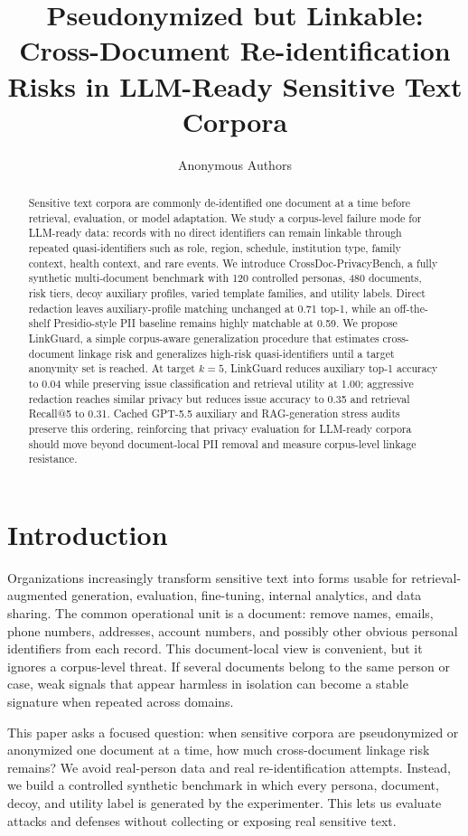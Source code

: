 \documentclass[10pt,twocolumn]{article}
\title{Pseudonymized but Linkable:\\
Cross-Document Re-identification Risks in LLM-Ready Sensitive Text Corpora}
\author{Anonymous Authors}
\date{}
\newcommand{\method}{LinkGuard}
\newcommand{\bench}{CrossDoc-PrivacyBench}
\begin{document}
\maketitle

\begin{abstract}
Sensitive text corpora are commonly de-identified one document at a time before retrieval, evaluation, or model adaptation.
We study a corpus-level failure mode for LLM-ready data: records with no direct identifiers can remain linkable through repeated quasi-identifiers such as role, region, schedule, institution type, family context, health context, and rare events.
We introduce \bench, a fully synthetic multi-document benchmark with 120 controlled personas, 480 documents, risk tiers, decoy auxiliary profiles, varied template families, and utility labels.
Direct redaction leaves auxiliary-profile matching unchanged at 0.71 top-1, while an off-the-shelf Presidio-style PII baseline remains highly matchable at 0.59.
We propose \method, a simple corpus-aware generalization procedure that estimates cross-document linkage risk and generalizes high-risk quasi-identifiers until a target anonymity set is reached.
At target $k=5$, \method{} reduces auxiliary top-1 accuracy to 0.04 while preserving issue classification and retrieval utility at 1.00; aggressive redaction reaches similar privacy but reduces issue accuracy to 0.35 and retrieval Recall@5 to 0.31.
Cached GPT-5.5 auxiliary and RAG-generation stress audits preserve this ordering, reinforcing that privacy evaluation for LLM-ready corpora should move beyond document-local PII removal and measure corpus-level linkage resistance.
\end{abstract}

\section{Introduction}
Organizations increasingly transform sensitive text into forms usable for retrieval-augmented generation, evaluation, fine-tuning, internal analytics, and data sharing.
The common operational unit is a document: remove names, emails, phone numbers, addresses, account numbers, and possibly other obvious personal identifiers from each record.
This document-local view is convenient, but it ignores a corpus-level threat.
If several documents belong to the same person or case, weak signals that appear harmless in isolation can become a stable signature when repeated across domains.

This paper asks a focused question: when sensitive corpora are pseudonymized or anonymized one document at a time, how much cross-document linkage risk remains?
We avoid real-person data and real re-identification attempts.
Instead, we build a controlled synthetic benchmark in which every persona, document, decoy, and utility label is generated by the experimenter.
This lets us evaluate attacks and defenses without collecting or exposing real sensitive text.
\end{document}
